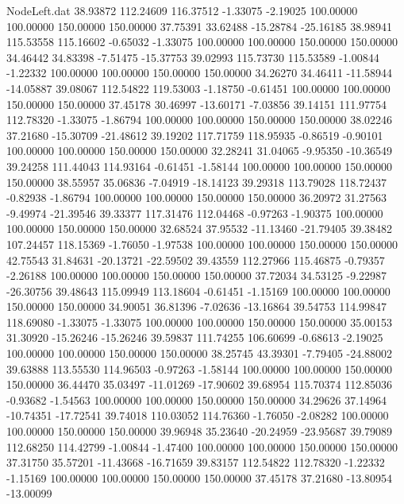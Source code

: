 \begin{filecontents}{NodeLeft.dat}
  38.93872  112.24609  116.37512    -1.33075   -2.19025  100.00000  100.00000  150.00000  150.00000   37.75391   33.62488  -15.28784  -25.16185
  38.98941  115.53558  115.16602    -0.65032   -1.33075  100.00000  100.00000  150.00000  150.00000   34.46442   34.83398   -7.51475  -15.37753
  39.02993  115.73730  115.53589    -1.00844   -1.22332  100.00000  100.00000  150.00000  150.00000   34.26270   34.46411  -11.58944  -14.05887
  39.08067  112.54822  119.53003    -1.18750   -0.61451  100.00000  100.00000  150.00000  150.00000   37.45178   30.46997  -13.60171   -7.03856
  39.14151  111.97754  112.78320    -1.33075   -1.86794  100.00000  100.00000  150.00000  150.00000   38.02246   37.21680  -15.30709  -21.48612
  39.19202  117.71759  118.95935    -0.86519   -0.90101  100.00000  100.00000  150.00000  150.00000   32.28241   31.04065   -9.95350  -10.36549
  39.24258  111.44043  114.93164    -0.61451   -1.58144  100.00000  100.00000  150.00000  150.00000   38.55957   35.06836   -7.04919  -18.14123
  39.29318  113.79028  118.72437    -0.82938   -1.86794  100.00000  100.00000  150.00000  150.00000   36.20972   31.27563   -9.49974  -21.39546
  39.33377  117.31476  112.04468    -0.97263   -1.90375  100.00000  100.00000  150.00000  150.00000   32.68524   37.95532  -11.13460  -21.79405
  39.38482  107.24457  118.15369    -1.76050   -1.97538  100.00000  100.00000  150.00000  150.00000   42.75543   31.84631  -20.13721  -22.59502
  39.43559  112.27966  115.46875    -0.79357   -2.26188  100.00000  100.00000  150.00000  150.00000   37.72034   34.53125   -9.22987  -26.30756
  39.48643  115.09949  113.18604    -0.61451   -1.15169  100.00000  100.00000  150.00000  150.00000   34.90051   36.81396   -7.02636  -13.16864
  39.54753  114.99847  118.69080    -1.33075   -1.33075  100.00000  100.00000  150.00000  150.00000   35.00153   31.30920  -15.26246  -15.26246
  39.59837  111.74255  106.60699    -0.68613   -2.19025  100.00000  100.00000  150.00000  150.00000   38.25745   43.39301   -7.79405  -24.88002
  39.63888  113.55530  114.96503    -0.97263   -1.58144  100.00000  100.00000  150.00000  150.00000   36.44470   35.03497  -11.01269  -17.90602
  39.68954  115.70374  112.85036    -0.93682   -1.54563  100.00000  100.00000  150.00000  150.00000   34.29626   37.14964  -10.74351  -17.72541
  39.74018  110.03052  114.76360    -1.76050   -2.08282  100.00000  100.00000  150.00000  150.00000   39.96948   35.23640  -20.24959  -23.95687
  39.79089  112.68250  114.42799    -1.00844   -1.47400  100.00000  100.00000  150.00000  150.00000   37.31750   35.57201  -11.43668  -16.71659
  39.83157  112.54822  112.78320    -1.22332   -1.15169  100.00000  100.00000  150.00000  150.00000   37.45178   37.21680  -13.80954  -13.00099

\end{filecontents}
